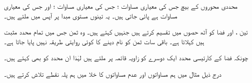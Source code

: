 محددی محوروں کے بیچ  جس کی معیاری مساوات ؛  جس کی معیاری مساوات ؛ اور  جس کی معیاری مساوات  ہے پائی جاتی ہیں۔ یہ تینوں مستوی مبدا  پر آپس میں ملتے ہیں۔

تین  ،  اور  فضا کو آٹھ حصوں میں تقسیم کرتے ہیں جنہیں  کہتے ہیں۔ وہ ثمن جس میں تمام محدد مثبت ہیں  کہلاتا ہے۔ باقی سات ثمن کو نام دینے کا کوئی روایتی طریقہ نہیں پایا جاتا ہے۔

چونکہ فضا کے کارتیسی محدد ایک دوسرے کو زاویہ قائمہ پر ملتے ہیں لہٰذا ان محدد  کو  بھی کہتے ہیں۔  

درج ذیل مثال میں ہم مساواتوں اور عدم مساواتوں کا خلا میں ہم پلہ نقطے تلاش کرتے ہیں۔ 
